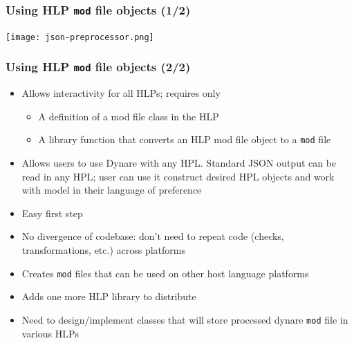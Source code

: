 \documentclass{beamer}
\begin{document}
\begin{frame}
  \frametitle{Using HLP \texttt{mod} file objects (1/2)}
  \begin{center}
    \texttt{[image: json-preprocessor.png]}
  \end{center}
\end{frame}

\begin{frame}
  \frametitle{Using HLP \texttt{mod} file objects (2/2)}
  \begin{itemize}
  \item Allows interactivity for all HLPs; requires only
    \begin{itemize}
    \item A definition of a mod file class in the HLP
    \item A library function that converts an HLP mod file object to a \texttt{mod} file
    \end{itemize}
  \item Allows users to use Dynare with any HPL. Standard JSON output can be read in any HPL; user can use it construct desired HPL objects and work with model in their language of preference
  \item Easy first step
  \item No divergence of codebase: don't need to repeat code (checks, transformations, etc.) across platforms
  \item Creates \texttt{mod} files that can be used on other host language platforms
  \item Adds one more HLP library to distribute
  \item Need to design/implement classes that will store processed dynare \texttt{mod} file in various HLPs
  \end{itemize}
\end{frame}
\end{document}
